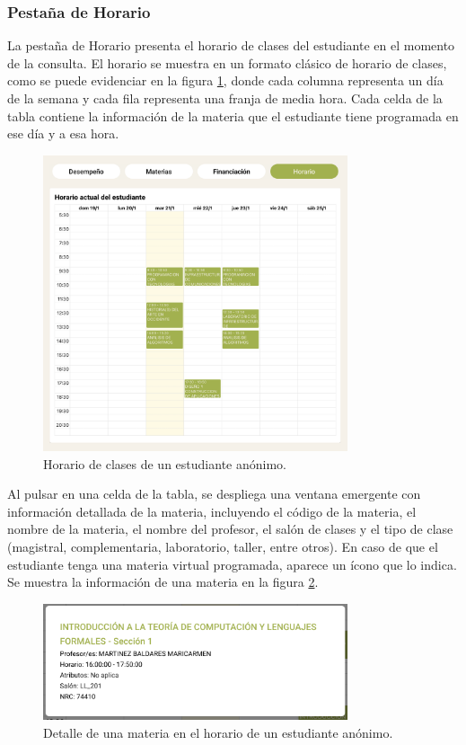 \subsubsection{Pestaña de Horario}

La pestaña de Horario presenta el horario de clases del estudiante en el momento de la consulta. El horario se muestra en un formato clásico de horario de clases, como se puede evidenciar en la figura \ref{fig:horario}, donde cada columna representa un día de la semana y cada fila representa una franja de media hora. Cada celda de la tabla contiene la información de la materia que el estudiante tiene programada en ese día y a esa hora.

\begin{figure}[H]
	\centering
	\includegraphics[width=0.8\textwidth]{assets/nes/horario.png}
	\caption{Horario de clases de un estudiante anónimo.}
	\label{fig:horario}
\end{figure}

Al pulsar en una celda de la tabla, se despliega una ventana emergente con información detallada de la materia, incluyendo el código de la materia, el nombre de la materia, el nombre del profesor, el salón de clases y el tipo de clase (magistral, complementaria, laboratorio, taller, entre otros). En caso de que el estudiante tenga una materia virtual programada, aparece un ícono que lo indica. Se muestra la información de una materia en la figura \ref{fig:detalle_horario}.

\begin{figure}[H]
	\centering
	\includegraphics[width=0.8\textwidth]{assets/nes/detalle_horario.png}
	\caption{Detalle de una materia en el horario de un estudiante anónimo.}
	\label{fig:detalle_horario}
\end{figure}

